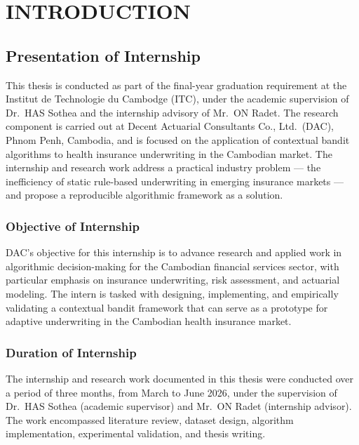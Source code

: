 \chapter{INTRODUCTION}\label{chapter-i.-introduction}

\section{Presentation of Internship}\label{presentation-of-internship}

This thesis is conducted as part of the final-year graduation requirement at the Institut de Technologie du Cambodge (ITC), under the academic supervision of Dr.~HAS Sothea and the internship advisory of Mr.~ON Radet. The research component is carried out at Decent Actuarial Consultants Co., Ltd.~(DAC), Phnom Penh, Cambodia, and is focused on the application of contextual bandit algorithms to health insurance underwriting in the Cambodian market. The internship and research work address a practical industry problem --- the inefficiency of static rule-based underwriting in emerging insurance markets --- and propose a reproducible algorithmic framework as a solution.

\subsection{Objective of Internship}\label{objective-of-internship}

DAC's objective for this internship is to advance research and applied work in algorithmic decision-making for the Cambodian financial services sector, with particular emphasis on insurance underwriting, risk assessment, and actuarial modeling. The intern is tasked with designing, implementing, and empirically validating a contextual bandit framework that can serve as a prototype for adaptive underwriting in the Cambodian health insurance market.

\subsection{Duration of Internship}\label{duration-of-internship}

The internship and research work documented in this thesis were conducted over a period of three months, from March to June 2026, under the supervision of Dr.~HAS Sothea (academic supervisor) and Mr.~ON Radet (internship advisor). The work encompassed literature review, dataset design, algorithm implementation, experimental validation, and thesis writing.

